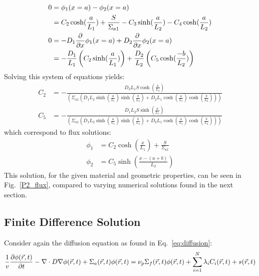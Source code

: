 \documentclass[12pt]{article}
\newcommand{\figref}[1]{Fig.~\ref{#1}}
\begin{document}
\begin{align}
    \label{eq:prob2-abounds}
    0 &= \phi_1(x=a) - \phi_2(x=a)\\
      &= C_2\cosh(\frac{a}{L_1}) + \frac{S}{\Sigma_{a1}} - C_3\sinh(\frac{a}{L_2}) - C_4\cosh(\frac{a}{L_2})\nonumber\\
    0 &= -D_1\frac{\partial}{\partial x}\phi_1(x=a) + D_2\frac{\partial}{\partial x}\phi_2(x=a) \\
      &= -\frac{D_1}{L_1}\left(C_2\sinh(\frac{a}{L_1})\right) + \frac{D_2}{L_2}\left(C_5\cosh(\frac{-b}{L_2})\right)\nonumber\\
\end{align}
Solving this system of equations yields:
\begin{align}
    \label{eq:prob2-coeffs}
    C_2 &= -\frac{D_2 L_1 S \cosh(\frac{b}{L_2})}{\left(\Sigma_{a1} \left(D_1 L_2 \sinh(\frac{a}{L_1}) \sinh(\frac{b}{L_2}) + D_2 L_1 \cosh(\frac{a}{L_1}) \cosh(\frac{b}{L_2})\right)\right)} \\
    C_5 &= -\frac{D_1 L_2 S \sinh(\frac{a}{L_1})}{\left(\Sigma_{a1} \left(D_1 L_2 \sinh(\frac{a}{L_1}) \sinh(\frac{b}{L_2}) + D_2 L_1 \cosh(\frac{a}{L_1}) \cosh(\frac{b}{L_2})\right)\right)}\nonumber
\end{align}
which correspond to flux solutions:
\begin{align}
    \label{eq:reduced-sols}
    \phi_1&=C_2\cosh(\frac{x}{L_1}) + \frac{S}{\Sigma_{a1}} \\
    \phi_2&=C_5\sinh(\frac{x-(a+b)}{L_2})\nonumber
\end{align}
This solution, for the given material and geometric properties, can be seen in \figref{P2_flux}, compared to varying numerical solutions found in the next section.
\subsection{Finite Difference Solution}
Consider again the diffusion equation as found in Eq.~\ref{eq:diffusion}:
\begin{equation*}
    \frac{1}{v}\frac{\partial \phi(\vec{r}, t)}{\partial t}-\nabla\cdot D\nabla\phi(\vec{r}, t) + \Sigma_a(\vec{r}, t)\phi(\vec{r}, t) = \nu_p\Sigma_f(\vec{r}, t)\phi(\vec{r}, t) + \sum_{i=1}^{N}\lambda_iC_i(\vec{r}, t) + s(\vec{r}, t)
\end{equation*}
\end{document}
